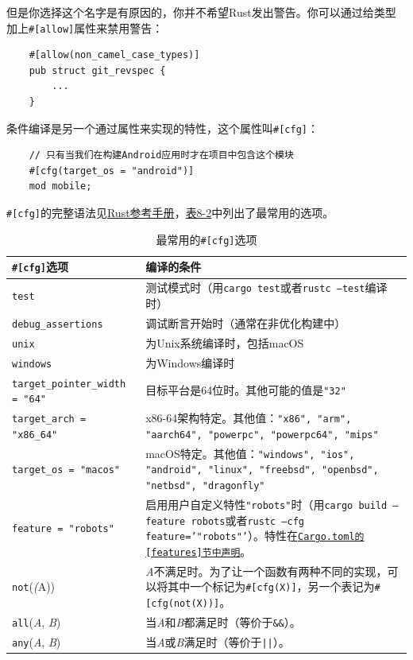 但是你选择这个名字是有原因的，你并不希望Rust发出警告。你可以通过给类型加上\texttt{\#[allow]}属性来禁用警告：
\begin{verbatim}
    #[allow(non_camel_case_types)]
    pub struct git_revspec {
        ...
    }
\end{verbatim}

条件编译是另一个通过属性来实现的特性，这个属性叫\texttt{\#[cfg]}：
\begin{verbatim}
    // 只有当我们在构建Android应用时才在项目中包含这个模块
    #[cfg(target_os = "android")]
    mod mobile;
\end{verbatim}

\texttt{\#[cfg]}的完整语法见\href{https://doc.rust-lang.org/reference/conditional-compilation.html}{Rust参考手册}，\hyperref[t8-2]{表8-2}中列出了最常用的选项。

\begin{table}[htbp]
    \centering
    \caption{最常用的\texttt{\#[cfg]}选项}
    \label{t8-2}
    \begin{tabular}{p{}p{}}
        \hline
        \textbf{\texttt{\#[cfg]}选项}   & \textbf{编译的条件} \\
        \hline
        \texttt{test}   & 测试模式时（用\texttt{cargo test}或者\texttt{rustc --test}编译时） \\
        \rowcolor{tablecolor}
        \texttt{debug\_assertions} & 调试断言开始时（通常在非优化构建中） \\
        \texttt{unix}   & 为Unix系统编译时，包括macOS \\
        \rowcolor{tablecolor}
        \texttt{windows}& 为Windows编译时 \\
        \texttt{target\_pointer\_width = "64"} & 目标平台是64位时。其他可能的值是\texttt{"32"} \\
        \rowcolor{tablecolor}
        \texttt{target\_arch = "x86\_64"} & x86-64架构特定。其他值：\texttt{"x86", "arm", "aarch64", "powerpc", "powerpc64", "mips"} \\
        \texttt{target\_os = "macos"} & macOS特定。其他值：\texttt{"windows", "ios", "android", "linux", "freebsd", "openbsd", "netbsd", "dragonfly"} \\
        \rowcolor{tablecolor}
        \texttt{feature = "robots"} & 启用用户自定义特性\texttt{"robots"}时（用\texttt{cargo build --feature robots}或者\texttt{rustc --cfg feature='"robots"'}）。特性在\href{https://doc.rust-lang.org/cargo/reference/manifest.html}{\texttt{Cargo.toml的\texttt{[features]}节中声明}}。 \\
        \texttt{not}(\emph(A)) & \emph{A}不满足时。为了让一个函数有两种不同的实现，可以将其中一个标记为\texttt{\#[cfg(X)]}，另一个表记为\texttt{\#[cfg(not(X))]}。 \\
        \rowcolor{tablecolor}
        \texttt{all}(\emph{A}, \emph{B}) & 当\emph{A}和\emph{B}都满足时（等价于\texttt{\&\&}）。 \\
        \texttt{any}(\emph{A}, \emph{B}) & 当\emph{A}或\emph{B}满足时（等价于\texttt{||}）。 \\
    \end{tabular}
\end{table}

